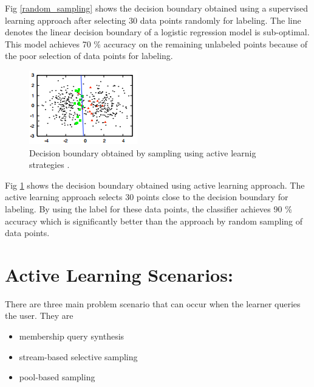 Fig \ref{random_sampling} shows the decision boundary obtained using a supervised learning approach after selecting 30 data points randomly for labeling. The line denotes the linear decision boundary of a logistic regression model is sub-optimal. This model achieves 70 \% accuracy on the remaining unlabeled points because of the poor selection of data points for labeling.

\begin{figure}[h!]
	\centering
	\includegraphics[scale=1]{images/active_sampling}
	\caption{Decision boundary obtained by sampling using active learnig strategies \cite{Settles2010}.}
	\label{active_sampling}
\end{figure}


Fig \ref{active_sampling} shows the decision boundary obtained using active learning approach. The active learning approach selects 30 points close to the decision boundary for labeling. By using the label for these data points, the classifier achieves 90 \% accuracy which is significantly better than the approach by random sampling of data points. \cite{Settles2010}

\section{Active Learning Scenarios:}


There are three main problem scenario that can occur when the learner queries the user. They are 
\begin{itemize}
\item membership query synthesis
\item stream-based selective sampling
\item pool-based sampling
\end{itemize}

